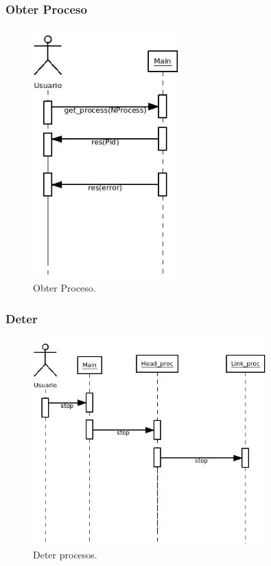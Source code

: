 \documentclass[DIV=calc,paper=a4,fontsize=11pt,onecolumn]{scrartcl}	 %
\begin{document}
\newpage
\subsubsection{Obter Proceso}

\begin{figure}[h]
\centering
\includegraphics[width=0.5\textwidth]{./figuras/Diagrama5.jpeg}
\caption{Obter Proceso.}
\label{fig:anelEstCU}
\end{figure}

\newpage
\subsubsection{Deter}

\begin{figure}[h]
\centering
\includegraphics[width=0.8\textwidth]{./figuras/Diagrama6.jpeg}
\caption{Deter procesos.}
\label{fig:anelEstCU}
\end{figure}
\newpage
\end{document}
